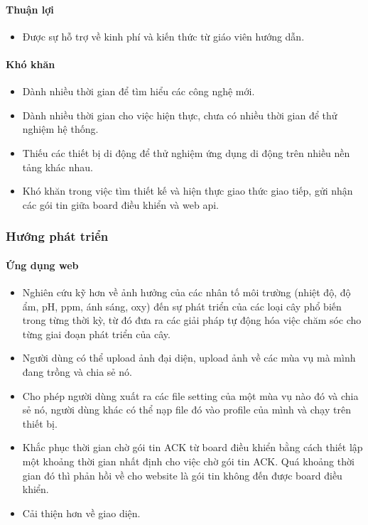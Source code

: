 \documentclass[a4paper,12pt,oneside]{article}
\begin{document}
	\paragraph{Thuận lợi}
		\begin{itemize}
		\item Được sự hỗ trợ về kinh phí và kiến thức từ giáo viên hướng dẫn. 
		\end{itemize}
	\paragraph{Khó khăn}
		\begin{itemize}
		\item Dành nhiều thời gian để tìm hiểu các công nghệ mới. 

		\item Dành nhiều thời gian cho việc hiện thực, chưa có nhiều thời gian để thử nghiệm hệ thống. 

		\item Thiếu các thiết bị di động để thử nghiệm ứng dụng di động trên nhiều nền tảng khác nhau. 

		\item  Khó khăn trong việc tìm thiết kế và hiện thực giao thức giao tiếp, gửi nhận các gói tin giữa board điều khiển và web api. 
		\end{itemize}
	
	\subsubsection{Hướng phát triển}
\paragraph{Ứng dụng web}
\begin{itemize}
\item Nghiên cứu kỹ hơn về ảnh hưởng của các nhân tố môi trường (nhiệt độ, độ ẩm, pH, ppm, ánh sáng, oxy) đến sự phát triển của các loại cây phổ biến trong từng thời kỳ, từ đó đưa ra các giải pháp tự động hóa việc chăm sóc cho từng giai đoạn phát triển của cây.
\item Người dùng có thể upload ảnh đại diện, upload ảnh về các mùa vụ mà mình đang trồng và chia sẻ nó.
\item Cho phép người dùng xuất ra các file setting của một mùa vụ nào đó và chia sẻ nó, người dùng khác có thể nạp file đó vào profile của mình và chạy trên thiết bị.
\item Khắc phục thời gian chờ gói tin ACK từ board điều khiển bằng cách thiết lập một khoảng thời gian nhất định cho việc chờ gói tin ACK. Quá khoảng thời gian đó thì phản hồi về cho website là gói tin không đến được board điều khiển.
\item Cải thiện hơn về giao diện.
\end{itemize}
\end{document}
